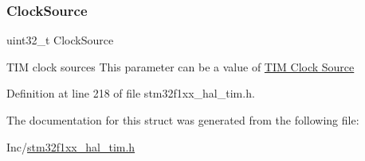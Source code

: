 \subsubsection{\texorpdfstring{Clock\+Source}{ClockSource}}
{\footnotesize\ttfamily uint32\+\_\+t Clock\+Source}

T\+IM clock sources This parameter can be a value of \hyperlink{group___t_i_m___clock___source}{T\+IM Clock Source} 

Definition at line 218 of file stm32f1xx\+\_\+hal\+\_\+tim.\+h.



The documentation for this struct was generated from the following file\+:\begin{DoxyCompactItemize}
\item 
Inc/\hyperlink{stm32f1xx__hal__tim_8h}{stm32f1xx\+\_\+hal\+\_\+tim.\+h}\end{DoxyCompactItemize}
